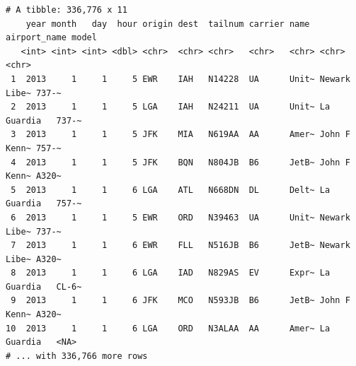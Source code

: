 \documentclass[
  11pt,
]{krantz}
\newenvironment{Shaded}{\begin{snugshade}}{\end{snugshade}}
\newcommand{\CommentTok}[1]{\textcolor[rgb]{0.37,0.37,0.37}{\textit{#1}}}
\newcommand{\DataTypeTok}[1]{\textcolor[rgb]{0.27,0.27,0.27}{#1}}
\newcommand{\KeywordTok}[1]{\textcolor[rgb]{0.27,0.27,0.27}{\textbf{#1}}}
\newcommand{\NormalTok}[1]{#1}
\newcommand{\OperatorTok}[1]{\textcolor[rgb]{0.43,0.43,0.43}{\textbf{#1}}}
\newcommand{\StringTok}[1]{\textcolor[rgb]{0.5,0.5,0.5}{#1}}
\begin{document}
\begin{Shaded}
\end{Shaded}

\begin{verbatim}
# A tibble: 336,776 x 11
    year month   day  hour origin dest  tailnum carrier name  airport_name model
   <int> <int> <int> <dbl> <chr>  <chr> <chr>   <chr>   <chr> <chr>        <chr>
 1  2013     1     1     5 EWR    IAH   N14228  UA      Unit~ Newark Libe~ 737-~
 2  2013     1     1     5 LGA    IAH   N24211  UA      Unit~ La Guardia   737-~
 3  2013     1     1     5 JFK    MIA   N619AA  AA      Amer~ John F Kenn~ 757-~
 4  2013     1     1     5 JFK    BQN   N804JB  B6      JetB~ John F Kenn~ A320~
 5  2013     1     1     6 LGA    ATL   N668DN  DL      Delt~ La Guardia   757-~
 6  2013     1     1     5 EWR    ORD   N39463  UA      Unit~ Newark Libe~ 737-~
 7  2013     1     1     6 EWR    FLL   N516JB  B6      JetB~ Newark Libe~ A320~
 8  2013     1     1     6 LGA    IAD   N829AS  EV      Expr~ La Guardia   CL-6~
 9  2013     1     1     6 JFK    MCO   N593JB  B6      JetB~ John F Kenn~ A320~
10  2013     1     1     6 LGA    ORD   N3ALAA  AA      Amer~ La Guardia   <NA> 
# ... with 336,766 more rows
\end{verbatim}
\end{document}
